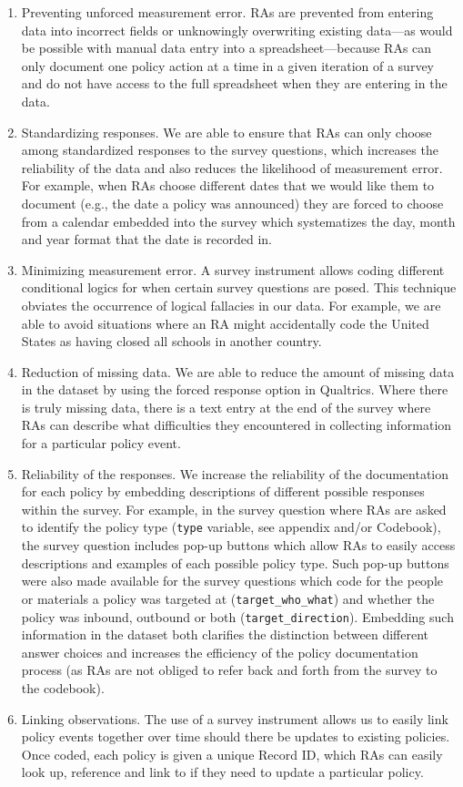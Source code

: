 \documentclass[
]{article}
\begin{document}
\begin{enumerate}
\def\labelenumi{\arabic{enumi}.}
\item
  Preventing unforced measurement error. RAs are prevented from entering data into incorrect fields or unknowingly overwriting existing data---as would be possible with manual data entry into a spreadsheet---because RAs can only document one policy action at a time in a given iteration of a survey and do not have access to the full spreadsheet when they are entering in the data.
\item
  Standardizing responses. We are able to ensure that RAs can only choose among standardized responses to the survey questions, which increases the reliability of the data and also reduces the likelihood of measurement error. For example, when RAs choose different dates that we would like them to document (e.g., the date a policy was announced) they are forced to choose from a calendar embedded into the survey which systematizes the day, month and year format that the date is recorded in.
\item
  Minimizing measurement error. A survey instrument allows coding different conditional logics for when certain survey questions are posed. This technique obviates the occurrence of logical fallacies in our data. For example, we are able to avoid situations where an RA might accidentally code the United States as having closed all schools in another country.
\item
  Reduction of missing data. We are able to reduce the amount of missing data in the dataset by using the forced response option in Qualtrics. Where there is truly missing data, there is a text entry at the end of the survey where RAs can describe what difficulties they encountered in collecting information for a particular policy event.
\item
  Reliability of the responses. We increase the reliability of the documentation for each policy by embedding descriptions of different possible responses within the survey. For example, in the survey question where RAs are asked to identify the policy type (\texttt{type} variable, see appendix and/or Codebook), the survey question includes pop-up buttons which allow RAs to easily access descriptions and examples of each possible policy type. Such pop-up buttons were also made available for the survey questions which code for the people or materials a policy was targeted at (\texttt{target\_who\_what}) and whether the policy was inbound, outbound or both (\texttt{target\_direction}). Embedding such information in the dataset both clarifies the distinction between different answer choices and increases the efficiency of the policy documentation process (as RAs are not obliged to refer back and forth from the survey to the codebook).
\item
  Linking observations. The use of a survey instrument allows us to easily link policy events together over time should there be updates to existing policies. Once coded, each policy is given a unique Record ID, which RAs can easily look up, reference and link to if they need to update a particular policy.
\end{enumerate}
\end{document}
